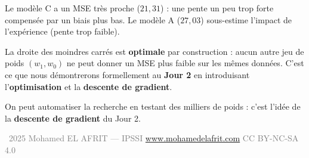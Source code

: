 Le mod\`{e}le C a un MSE tr\`{e}s proche ($21{,}31$) : une pente un peu trop forte compens\'{e}e par un biais plus bas.
Le mod\`{e}le A ($27{,}03$) sous-estime l'impact de l'exp\'{e}rience (pente trop faible).

\begin{retenirbox}
    La droite des moindres carr\'{e}s est \textbf{optimale} par construction : aucun autre jeu de poids
    $(w_1, w_0)$ ne peut donner un MSE plus faible sur les m\^{e}mes donn\'{e}es. C'est ce
    que nous d\'{e}montrerons formellement au \textbf{Jour 2} en introduisant l'\textbf{optimisation}
    et la \textbf{descente de gradient}.
\end{retenirbox}

\begin{intuitionbox}
    On peut automatiser la recherche en testant des milliers de poids :
    c'est l'id\'{e}e de la \textbf{descente de gradient} du Jour 2.
\end{intuitionbox}

\vfill
\begin{center}
    {\footnotesize\sffamily\textcolor{gray}{%
        \textcopyright\ 2025 Mohamed EL AFRIT --- IPSSI \enspace\textbullet\enspace
        \url{www.mohamedelafrit.com} \enspace\textbullet\enspace
        CC BY-NC-SA 4.0
    }}
\end{center}


